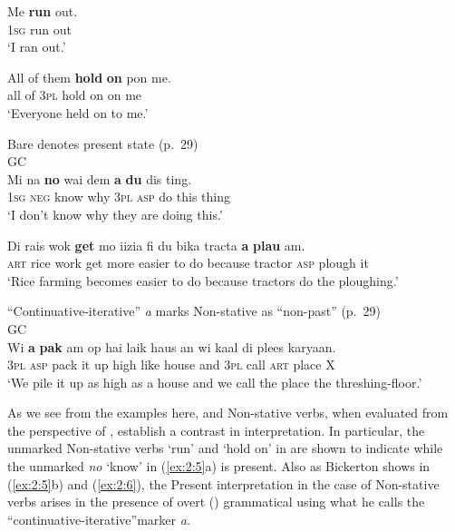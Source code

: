 \ex
\gll Me  \textbf{run} out.\\
\textsc{1sg} run out\\
\glt `I ran out.'

\ex All of    them \textbf{hold} \textbf{on} pon me.\\
    all of    \textsc{3pl}  hold on on me\\
\glt `Everyone held on to me.' \z \z

\ea\label{ex:2:5}
{Bare  denotes present state (p.~29)}\\
GC  \\
\ea
\gll Mi na \textbf{no} wai dem \textbf{a} \textbf{du} dis ting.\\
        \textsc{1sg}  \textsc{neg} know why \textsc{3pl} \textsc{asp} do this thing\\
\glt `I don’t know why they are doing this.'

\ex
\gll Di       rais wok \textbf{get} mo     iizia      fi du bika           tracta  \textbf{a}        \textbf{plau}  am.\\
\textsc{art} rice work get more easier to do because tractor \textsc{asp}   plough   it\\
\glt `Rice farming becomes easier to do because tractors do the ploughing.'
\z
\z

\ea\label{ex:2:6} ``Continuative-iterative'' \textit{a} marks
Non-stative as ``non-past'' {(p.~29)}\\
GC\\
\gll  Wi                      \textbf{a}      \textbf{pak} am op hai     laik  haus     an      wi  kaal di   plees karyaan.\\
\textsc{3pl} \textsc{asp} pack    it   up high like house and \textsc{3pl} call \textsc{art} place X\\
\glt `We pile it up as high as a house and we call the place the threshing-floor.' \z

As we see from the examples here,  and Non-stative verbs, when
evaluated from the perspective of , establish a contrast in
interpretation.  In particular, the unmarked Non-stative verbs `run'
and `hold on' in  are shown to indicate  while the
unmarked  \textit{no} `know' in (\ref{ex:2:5}a) is present.
Also as Bickerton shows in (\ref{ex:2:5}b) and (\ref{ex:2:6}), the
Present  interpretation in the case of Non-stative verbs arises
in the presence of overt () grammatical 
using what he calls the ``continuative-iterative”marker \textit{a.}


